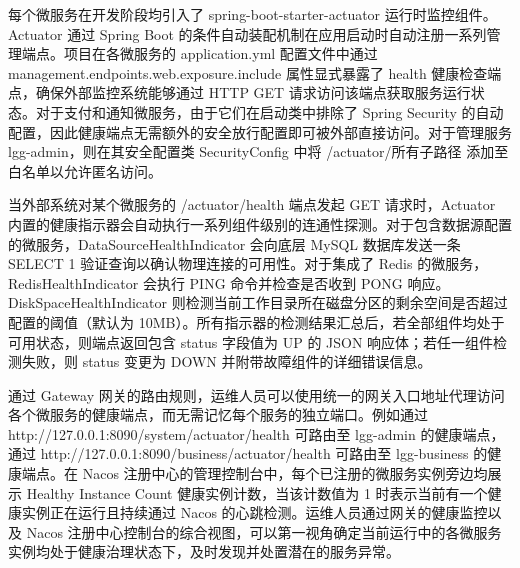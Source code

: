每个微服务在开发阶段均引入了 spring-boot-starter-actuator 运行时监控组件。Actuator 通过 Spring Boot 的条件自动装配机制在应用启动时自动注册一系列管理端点。项目在各微服务的 application.yml 配置文件中通过 management.endpoints.web.exposure.include 属性显式暴露了 health 健康检查端点，确保外部监控系统能够通过 HTTP GET 请求访问该端点获取服务运行状态。对于支付和通知微服务，由于它们在启动类中排除了 Spring Security 的自动配置，因此健康端点无需额外的安全放行配置即可被外部直接访问。对于管理服务 lgg-admin，则在其安全配置类 SecurityConfig 中将 /actuator/所有子路径 添加至白名单以允许匿名访问。

当外部系统对某个微服务的 /actuator/health 端点发起 GET 请求时，Actuator 内置的健康指示器会自动执行一系列组件级别的连通性探测。对于包含数据源配置的微服务，DataSourceHealthIndicator 会向底层 MySQL 数据库发送一条 SELECT 1 验证查询以确认物理连接的可用性。对于集成了 Redis 的微服务，RedisHealthIndicator 会执行 PING 命令并检查是否收到 PONG 响应。DiskSpaceHealthIndicator 则检测当前工作目录所在磁盘分区的剩余空间是否超过配置的阈值（默认为 10MB）。所有指示器的检测结果汇总后，若全部组件均处于可用状态，则端点返回包含 status 字段值为 UP 的 JSON 响应体；若任一组件检测失败，则 status 变更为 DOWN 并附带故障组件的详细错误信息。

通过 Gateway 网关的路由规则，运维人员可以使用统一的网关入口地址代理访问各个微服务的健康端点，而无需记忆每个服务的独立端口。例如通过 http://127.0.0.1:8090/system/actuator/health 可路由至 lgg-admin 的健康端点，通过 http://127.0.0.1:8090/business/actuator/health 可路由至 lgg-business 的健康端点。在 Nacos 注册中心的管理控制台中，每个已注册的微服务实例旁边均展示 Healthy Instance Count 健康实例计数，当该计数值为 1 时表示当前有一个健康实例正在运行且持续通过 Nacos 的心跳检测。运维人员通过网关的健康监控以及 Nacos 注册中心控制台的综合视图，可以第一视角确定当前运行中的各微服务实例均处于健康治理状态下，及时发现并处置潜在的服务异常。
